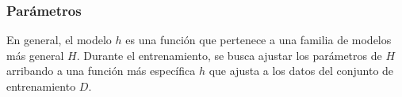 %
\subsubsection{Parámetros}
%
En general, el modelo $h$ es una función que pertenece a una familia de modelos más general $H$.
Durante el entrenamiento, se busca ajustar los parámetros de $H$ arribando a una función
más específica $h$ que ajusta a los datos del conjunto de entrenamiento $D$.
